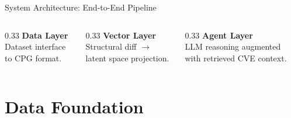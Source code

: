\documentclass[aspectratio=169,10pt]{beamer}
\begin{document}
\begin{frame}{System Architecture: End-to-End Pipeline}
\vfill
\begin{columns}[t]
  \begin{column}{0.33\textwidth}\centering
    \textbf{\textcolor{c1}{Data Layer}}\\
    \scriptsize Dataset interface to CPG format.
  \end{column}
  \begin{column}{0.33\textwidth}\centering
    \textbf{\textcolor{c3}{Vector Layer}}\\
    \scriptsize Structural diff $\rightarrow$ latent space projection.
  \end{column}
  \begin{column}{0.33\textwidth}\centering
    \textbf{\textcolor{c5}{Agent Layer}}\\
    \scriptsize LLM reasoning augmented with retrieved CVE context.
  \end{column}
\end{columns}
\end{frame}

\section{Data Foundation}
\end{document}
